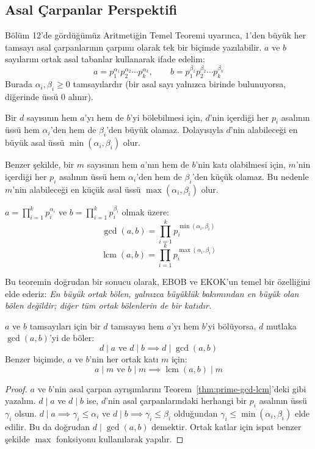 \subsection*{Asal Çarpanlar Perspektifi}

Bölüm 12'de gördüğümüz Aritmetiğin Temel Teoremi uyarınca, $1$'den büyük her tamsayı asal çarpanlarının çarpımı olarak tek bir biçimde yazılabilir. $a$ ve $b$ sayılarını ortak asal tabanlar kullanarak ifade edelim:
\[ a = p_1^{\alpha_1} p_2^{\alpha_2} \cdots p_k^{\alpha_k}, \qquad b = p_1^{\beta_1} p_2^{\beta_2} \cdots p_k^{\beta_k} \]
Burada $\alpha_i, \beta_i \ge 0$ tamsayılardır (bir asal sayı yalnızca birinde bulunuyorsa, diğerinde üssü $0$ alınır).

Bir $d$ sayısının hem $a$'yı hem de $b$'yi bölebilmesi için, $d$'nin içerdiği her $p_i$ asalının üssü hem $\alpha_i$'den hem de $\beta_i$'den büyük olamaz. Dolayısıyla $d$'nin alabileceği en büyük asal üssü $\min(\alpha_i, \beta_i)$ olur.

Benzer şekilde, bir $m$ sayısının hem $a$'nın hem de $b$'nin katı olabilmesi için, $m$'nin içerdiği her $p_i$ asalının üssü hem $\alpha_i$'den hem de $\beta_i$'den küçük olamaz. Bu nedenle $m$'nin alabileceği en küçük asal üssü $\max(\alpha_i, \beta_i)$ olur.

\begin{theorem}
\label{thm:prime-gcd-lcm}
$a = \prod_{i=1}^k p_i^{\alpha_i}$ ve $b = \prod_{i=1}^k p_i^{\beta_i}$ olmak üzere:
\[ \gcd(a, b) = \prod_{i=1}^k p_i^{\min(\alpha_i, \beta_i)} \]
\[ \operatorname{lcm}(a, b) = \prod_{i=1}^k p_i^{\max(\alpha_i, \beta_i)} \]
\end{theorem}

Bu teoremin doğrudan bir sonucu olarak, EBOB ve EKOK'un temel bir özelliğini elde ederiz: \textit{En büyük ortak bölen, yalnızca büyüklük bakımından en büyük olan bölen değildir; diğer tüm ortak bölenlerin de bir katıdır.}

\begin{theorem}
\label{thm:div-gcd}
$a$ ve $b$ tamsayıları için bir $d$ tamsayısı hem $a$'yı hem $b$'yi bölüyorsa, $d$ mutlaka $\gcd(a, b)$'yi de böler:
\[ d \mid a \text{ ve } d \mid b \implies d \mid \gcd(a, b) \]
Benzer biçimde, $a$ ve $b$'nin her ortak katı $m$ için:
\[ a \mid m \text{ ve } b \mid m \implies \operatorname{lcm}(a, b) \mid m \]
\end{theorem}

\begin{proof}
$a$ ve $b$'nin asal çarpan ayrışımlarını Teorem~\ref{thm:prime-gcd-lcm}'deki gibi yazalım. $d \mid a$ ve $d \mid b$ ise, $d$'nin asal çarpanlarındaki herhangi bir $p_i$ asalının üssü $\gamma_i$ olsun. $d \mid a \implies \gamma_i \le \alpha_i$ ve $d \mid b \implies \gamma_i \le \beta_i$ olduğundan $\gamma_i \le \min(\alpha_i, \beta_i)$ elde edilir. Bu da doğrudan $d \mid \gcd(a, b)$ demektir. Ortak katlar için ispat benzer şekilde $\max$ fonksiyonu kullanılarak yapılır.
\end{proof}

